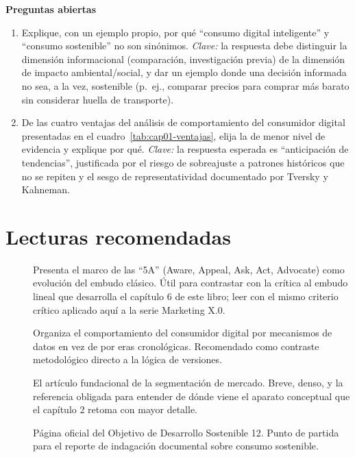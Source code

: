 \textbf{Preguntas abiertas}

\begin{enumerate}
  \item Explique, con un ejemplo propio, por qué \enquote{consumo digital
  inteligente} y \enquote{consumo sostenible} no son sinónimos. \textit{Clave:} la
  respuesta debe distinguir la dimensión informacional (comparación,
  investigación previa) de la dimensión de impacto ambiental/social, y dar un
  ejemplo donde una decisión informada no sea, a la vez, sostenible (p.\ ej.,
  comparar precios para comprar más barato sin considerar huella de
  transporte).
  \item De las cuatro ventajas del análisis de comportamiento del consumidor
  digital presentadas en el cuadro~\ref{tab:cap01-ventajas}, elija la de
  menor nivel de evidencia y explique por qué. \textit{Clave:} la respuesta
  esperada es \enquote{anticipación de tendencias}, justificada por el riesgo de
  sobreajuste a patrones históricos que no se repiten y el sesgo de
  representatividad documentado por Tversky y Kahneman.
\end{enumerate}

\section{Lecturas recomendadas}

\begin{description}
  \item[\textcite{kotler2021marketing50}] Presenta el marco de las \enquote{5A} (Aware,
  Appeal, Ask, Act, Advocate) como evolución del embudo clásico. Útil para
  contrastar con la crítica al embudo lineal que desarrolla el capítulo 6 de
  este libro; leer con el mismo criterio crítico aplicado aquí a la serie
  Marketing X.0.
  \item[\textcite{sheth2026}] Organiza el comportamiento del consumidor digital
  por mecanismos de datos en vez de por eras cronológicas. Recomendado como
  contraste metodológico directo a la lógica de versiones.
  \item[\textcite{smith1956}] El artículo fundacional de la segmentación de
  mercado. Breve, denso, y la referencia obligada para entender de dónde
  viene el aparato conceptual que el capítulo 2 retoma con mayor detalle.
  \item[\textcite{onu2015ods12}] Página oficial del Objetivo de Desarrollo
  Sostenible 12. Punto de partida para el reporte de indagación documental
  sobre consumo sostenible.
\end{description}
